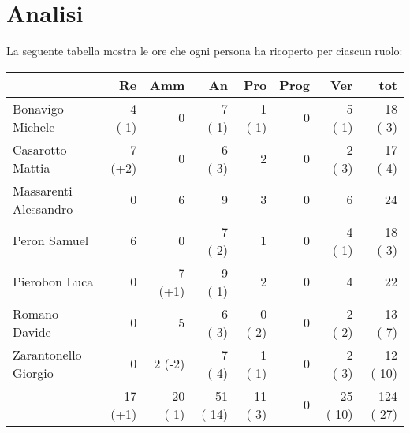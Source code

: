 \section{Analisi}

La seguente tabella mostra le ore che ogni persona ha ricoperto per ciascun ruolo:

\begin{table}[ht]
    \begin{tabularx}{\linewidth}{X|rrrrrrr}
    \rowcolor{gray!30}& Re & Amm & An & Pro & Prog & Ver & tot \\
    \hline
    Bonavigo Michele                        & 4 (-1)   & 0          & 7 (-1)       & 1 (-1)     & 0     & 5 (-1)   & 18 (-3) \\

    \rowcolor{gray!10}Casarotto Mattia      & 7 (+2)   & 0          & 6 (-3)       & 2          & 0     & 2 (-3)   & 17 (-4) \\

    Massarenti Alessandro                   & 0        & 6          & 9            & 3          & 0     & 6        & 24 \\ 

    \rowcolor{gray!10}Peron Samuel          & 6        & 0          & 7 (-2)       & 1          & 0     & 4 (-1)   & 18 (-3) \\ 

    Pierobon Luca                           & 0        & 7 (+1)     & 9 (-1)       & 2          & 0     & 4        & 22 \\ 

    \rowcolor{gray!10}Romano Davide         & 0        & 5          & 6 (-3)       & 0 (-2)     & 0     & 2 (-2)   & 13 (-7)\\

    Zarantonello Giorgio                    & 0        & 2 (-2)     & 7 (-4)       & 1 (-1)     & 0     & 2 (-3)   & 12 (-10)\\

    \hline                                  & 17 (+1)  & 20 (-1)    & 51 (-14)     & 11 (-3)    & 0     & 25 (-10)  & 124 (-27)\\  
    \end{tabularx}
\end{table}

